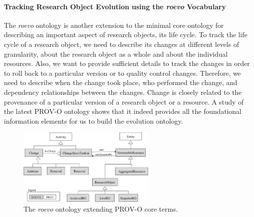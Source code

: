 \paragraph{Tracking Research Object Evolution using the \textit{roevo} Vocabulary}
The \textit{roevo} ontology is another extension to the minimal core ontology for describing an important aspect of research objects, its life cycle.
To track the life cycle of a research object, we need to describe its changes at different levels of granularity, about the research object as a whole and about the individual resources. Also, we want to provide sufficient details to track the changes in order to roll back to a particular version or to quality control changes. Therefore, we need to describe when the change took place, who performed the change, and dependency relationships between the changes. %
Change is closely related to the provenance of a particular version of a research object or a resource. A study of the latest PROV-O ontology shows that it indeed provides all the foundational information elements for us to build the evolution ontology. 

\begin{figure}[ht]
  \centering
  \includegraphics[width=0.6\textwidth]{Figures/roevo.png}
  \caption{The \textit{roevo} ontology extending PROV-O core terms.}
  \label{fig:ro_evo}
\end{figure}    

